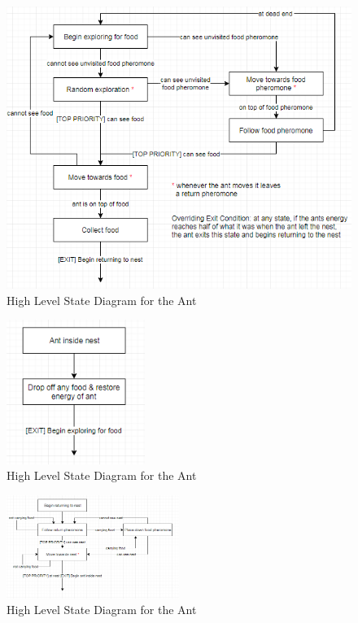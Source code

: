\begin{figure}[htb]
  \label{fig:ant-highlvl}
  \centering
  \includegraphics[width=1\textwidth]{images/exploring.png}
  \caption{High Level State Diagram for the Ant}
\end{figure}

\begin{figure}[htb]
  \label{fig:ant-highlvl}
  \centering
  \includegraphics[width=0.4\textwidth]{images/inside-nest.png}
  \caption{High Level State Diagram for the Ant}
\end{figure}

\begin{figure}[htb]
  \label{fig:ant-highlvl}
  \centering
  \includegraphics[width=0.5\textwidth]{images/nest-return.png}
  \caption{High Level State Diagram for the Ant}
\end{figure}

